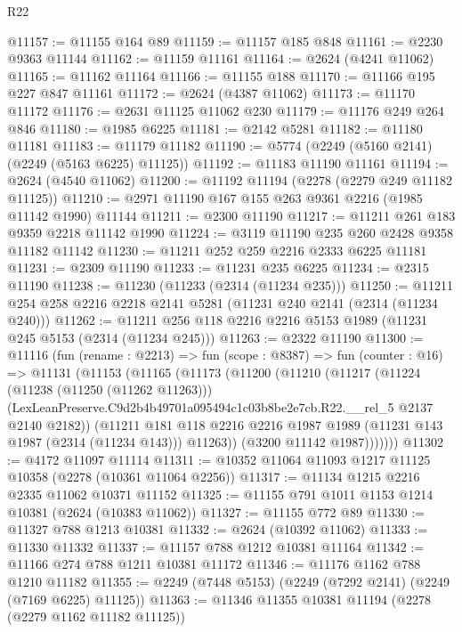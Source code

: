 \begin{lexlean}{R22}
\begin{coremodule}
@11157 := @11155 @164 @89
@11159 := @11157 @185 @848
@11161 := @2230 @9363 @11144
@11162 := @11159 @11161
@11164 := @2624 (@4241 @11062)
@11165 := @11162 @11164
@11166 := @11155 @188
@11170 := @11166 @195 @227 @847 @11161
@11172 := @2624 (@4387 @11062)
@11173 := @11170 @11172
@11176 := @2631 @11125 @11062 @230
@11179 := @11176 @249 @264 @846
@11180 := @1985 @6225
@11181 := @2142 @5281
@11182 := @11180 @11181
@11183 := @11179 @11182
@11190 := @5774 (@2249 (@5160 @2141) (@2249 (@5163 @6225) @11125))
@11192 := @11183 @11190 @11161
@11194 := @2624 (@4540 @11062)
@11200 := @11192 @11194 (@2278 (@2279 @249 @11182 @11125))
@11210 := @2971 @11190 @167 @155 @263 @9361 @2216 (@1985 @11142 @1990) @11144
@11211 := @2300 @11190
@11217 := @11211 @261 @183 @9359 @2218 @11142 @1990
@11224 := @3119 @11190 @235 @260 @2428 @9358 @11182 @11142
@11230 := @11211 @252 @259 @2216 @2333 @6225 @11181
@11231 := @2309 @11190
@11233 := @11231 @235 @6225
@11234 := @2315 @11190
@11238 := @11230 (@11233 (@2314 (@11234 @235)))
@11250 := @11211 @254 @258 @2216 @2218 @2141 @5281 (@11231 @240 @2141 (@2314 (@11234 @240)))
@11262 := @11211 @256 @118 @2216 @2216 @5153 @1989 (@11231 @245 @5153 (@2314 (@11234 @245)))
@11263 := @2322 @11190
@11300 := @11116
    (fun (rename : @2213) =>
    fun (scope : @8387) =>
    fun (counter : @16) =>
    @11131
      (@11153
        (@11165
          (@11173
            (@11200
              (@11210
                (@11217
                  (@11224
                    (@11238 (@11250 (@11262 @11263)))
                    (LexLeanPreserve.C9d2b4b49701a095494c1c03b8be2e7cb.R22.__rel_5
                      @2137
                      @2140
                      @2182))
                  (@11211
                    @181
                    @118
                    @2216
                    @2216
                    @1987
                    @1989
                    (@11231 @143 @1987 (@2314 (@11234 @143)))
                    @11263))
                (@3200 @11142 @1987)))))))
@11302 := @4172 @11097 @11114
@11311 := @10352 @11064 @11093 @1217 @11125 @10358 (@2278 (@10361 @11064 @2256))
@11317 := @11134 @1215 @2216 @2335 @11062 @10371 @11152
@11325 := @11155 @791 @1011 @1153 @1214 @10381 (@2624 (@10383 @11062))
@11327 := @11155 @772 @89
@11330 := @11327 @788 @1213 @10381
@11332 := @2624 (@10392 @11062)
@11333 := @11330 @11332
@11337 := @11157 @788 @1212 @10381 @11164
@11342 := @11166 @274 @788 @1211 @10381 @11172
@11346 := @11176 @1162 @788 @1210 @11182
@11355 := @2249 (@7448 @5153) (@2249 (@7292 @2141) (@2249 (@7169 @6225) @11125))
@11363 := @11346 @11355 @10381 @11194 (@2278 (@2279 @1162 @11182 @11125))

\end{coremodule}
\end{lexlean}
